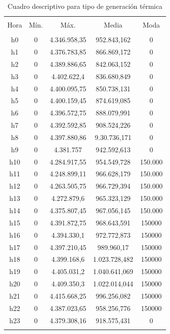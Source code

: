 \documentclass[conference, 10pt]{IEEEtran}
\begin{document}
\begin{table}[!htbp] \centering 
  \caption{Cuadro descriptivo para tipo de generación térmica} 
 
\begin{tabular}{@{\extracolsep{5pt}} ccccc} 
\\[-1.8ex]\hline 
\hline \\[-1.8ex] 
Hora & Mín. & Máx. & Media & Moda \\ 
\hline \\[-1.8ex] 
h0 & 0 & 4.346.958,35 & 952.843,162& 0 \\ 
h1 & 0 & 4.376.783,85 & 866.869,172& 0 \\ 
h2 & 0 & 4.389.886,65 & 842.063,152& 0 \\ 
h3 & 0 & 4.402.622,4 & 836.680,849& 0 \\ 
h4 & 0 & 4.400.095,75 & 850.738,131& 0 \\ 
h5 & 0 & 4.400.159,45 & 874.619,085& 0 \\ 
h6 & 0 & 4.396.572,75 & 888.079,991& 0 \\ 
h7 & 0 & 4.392.592,85 & 908.524,226& 0 \\ 
h8 & 0 & 4.397.880,86 & 9.30.736,171& 0 \\ 
h9 & 0 & 4.381.757 & 942.592,613& 0 \\ 
h10 & 0 & 4.284.917,55 & 954.549,728& 150.000 \\ 
h11 & 0 & 4.248.899,11 & 966.628,179& 150.000 \\ 
h12 & 0 & 4.263.505,75 & 966.729,394 & 150.000 \\ 
h13 & 0 & 4.272.879,6 & 965.323,129& 150.000 \\ 
h14 & 0 & 4.375.807,45 & 967.056,145 & 150.000 \\ 
h15 & 0 & 4.391.872,75 & 968.643,591 & 150000 \\ 
h16 & 0 & 4.394.330,1 & 972.772,873 & 150000 \\ 
h17 & 0 & 4.397.210,45 & 989.960,17 & 150000 \\ 
h18 & 0 & 4.399.168,6 & 1.023.728,482& 150000 \\ 
h19 & 0 & 4.405.031,2 & 1.040.641,069 & 150000 \\ 
h20 & 0 & 4.409.350,3 & 1.022.014,044 & 150000 \\ 
h21 & 0 & 4.415.668,25 & 996.256,082 & 150000 \\ 
h22 & 0 & 4.387.023,65 & 958.256,776 & 150000 \\ 
h23 & 0 & 4.379.308,16 & 918.575,431 & 0 \\ 
\hline \\[-1.8ex] 
\end{tabular} 
\label{tab_17}
\end{table}
\end{document}
